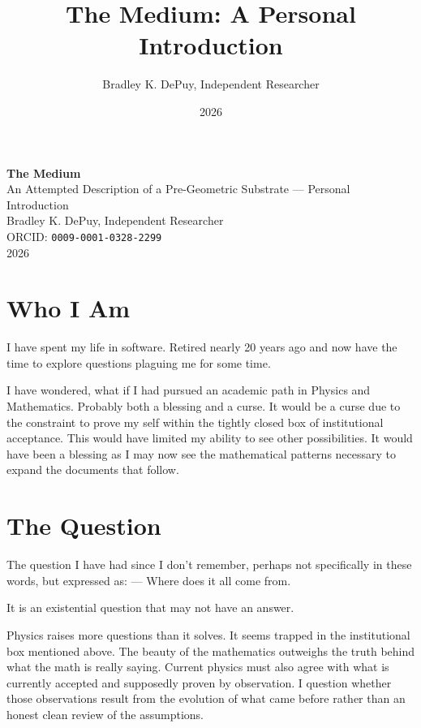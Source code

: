 \documentclass[11pt,letterpaper]{article}
\author{Bradley K. DePuy, Independent Researcher}
\date{2026}
\title{The Medium: A Personal Introduction}
\begin{document}
\pagestyle{plain}
\begin{titlepage}
\vspace*{4cm}
\begin{center}
  {\LARGE\bfseries The Medium}\\[0.6em]
  {\large An Attempted Description of a Pre-Geometric Substrate --- Personal Introduction}\\[2.5em]
  {\normalsize Bradley K. DePuy, Independent Researcher}\\[0.5em]
  {\normalsize ORCID: \mbox{\texttt{0009-0001-0328-2299}}}\\[0.5em]
  {\normalsize 2026}
\end{center}
\end{titlepage}
\pagestyle{body}

\section{Who I Am}
\label{sec:orge19bc34}

I have spent my life in software. Retired nearly 20 years ago and now have the time to explore questions plaguing me for some time.

I have wondered, what if I had pursued an academic path in Physics and Mathematics.  Probably both a blessing and a curse.
It would be a curse due to the constraint to prove my self within the tightly closed box of institutional acceptance.
This would have limited my ability to see other possibilities.
It would have been a blessing as I may now see the mathematical patterns necessary to expand the documents that follow.

\section{The Question}
\label{sec:orgc917f03}

The question I have had since I don't remember, perhaps not specifically in these words, but expressed as:
--- Where does it all come from.

It is an existential question that may not have an answer.

Physics raises more questions than it solves.  It seems trapped in the institutional box mentioned above.  The beauty of the mathematics outweighs the truth behind what the math is really saying. Current physics must also agree with what is currently accepted and supposedly proven by observation.  I question whether those observations result from the evolution of what came before rather than an honest clean review of the assumptions.
\end{document}
